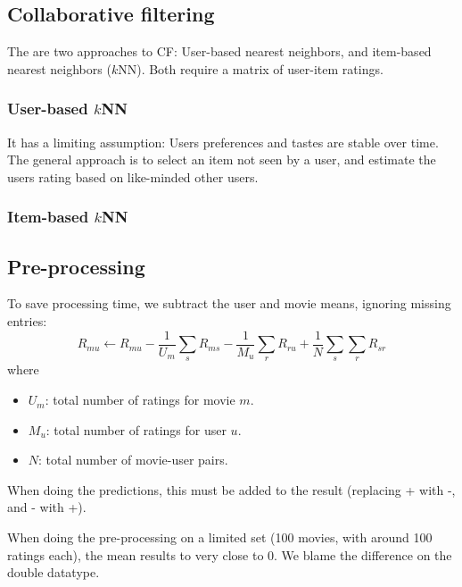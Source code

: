 \subsection{Collaborative filtering}
The are two approaches to CF: User-based nearest neighbors, and item-based nearest neighbors ($k$NN).
Both require a matrix of user-item ratings.

\subsubsection{User-based $k$NN}
It has a limiting assumption: Users preferences and tastes are stable over time.
The general approach is to select an item not seen by a user, and estimate the users rating based on like-minded other users.

\subsubsection{Item-based $k$NN}

\subsection{Pre-processing}
To save processing time, we subtract the user and movie means, ignoring missing entries:
\[
    R_{mu} \gets R_{mu} - \frac{1}{U_m}\sum_{s}{R_{ms}} - \frac{1}{M_u}\sum_{r}{R_{ru}} + \frac{1}{N}\sum_{s}\sum_{r}{R_{sr}}
\]
where
\begin{itemize}
    \item $U_m$: total number of ratings for movie $m$.
    \item $M_u$: total number of ratings for user $u$.
    \item $N$: total number of movie-user pairs.
\end{itemize}
%
When doing the predictions, this must be added to the result (replacing + with -, and - with +).

When doing the pre-processing on a limited set (100 movies, with around 100 ratings each), the mean results to very close to 0. We blame the difference on the double datatype.
